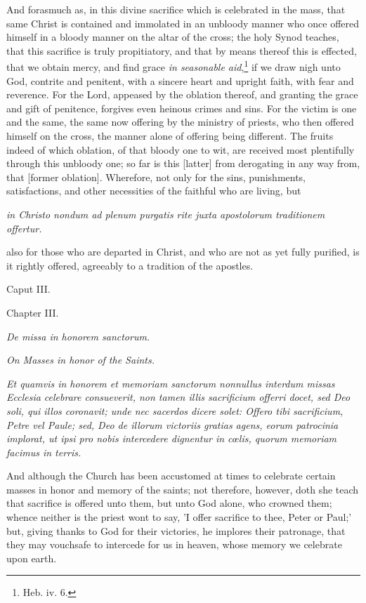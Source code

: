And forasmuch as, in this divine sacrifice which is celebrated in the mass, that same Christ is contained and immolated in an unbloody manner who once offered himself in a bloody manner on the altar of the cross; the holy Synod teaches, that this sacrifice is truly propitiatory, and that by means thereof this is effected, that we obtain mercy, and find grace \emph{in seasonable aid},\footnote{\par   Heb. iv. 6.} if we draw nigh unto God, contrite and penitent, with a sincere heart and upright faith, with fear and reverence. For the Lord, appeased by the oblation thereof, and granting the grace and gift of penitence, forgives even heinous crimes and sins. For the victim is one and the same, the same now offering by the ministry of priests, who then offered himself on the cross, the manner alone of offering being different. The fruits indeed of which oblation, of that bloody one to wit, are received most plentifully through this unbloody one; so far is this [latter] from derogating in any way from, that [former oblation]. Wherefore, not only for the sins, punishments, satisfactions, and other necessities of the faithful who are living, but

\emph{in Christo nondum ad plenum purgatis rite juxta apostolorum traditionem offertur.}

also for those who are departed in Christ, and who are not as yet fully purified, is it rightly offered, agreeably to a tradition of the apostles.

Caput III.

Chapter III.

\emph{De missa in honorem sanctorum.}

\emph{On Masses in honor of the Saints.}

\emph{Et quamvis in honorem et memoriam sanctorum nonnullus interdum missas Ecclesia celebrare consueverit, non tamen illis sacrificium offerri docet, sed Deo soli, qui illos coronavit; unde nec sacerdos dicere solet: Offero tibi sacrificium, Petre vel Paule; sed, Deo de illorum victoriis gratias agens, eorum patrocinia implorat, ut ipsi pro nobis intercedere dignentur in cœlis, quorum memoriam facimus in terris.}

And although the Church has been accustomed at times to celebrate certain masses in honor and memory of the saints; not therefore, however, doth she teach that sacrifice is offered unto them, but unto God alone, who crowned them; whence neither is the priest wont to say, 'I offer sacrifice to thee, Peter or Paul;' but, giving thanks to God for their victories, he implores their patronage, that they may vouchsafe to intercede for us in heaven, whose memory we celebrate upon earth.

